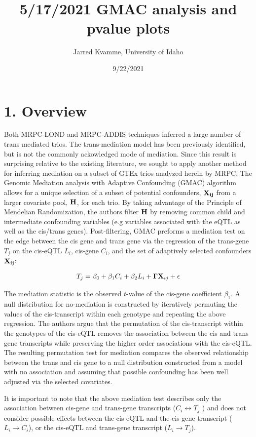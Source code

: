 \documentclass[
]{article}
\title{5/17/2021 GMAC analysis and pvalue plots}
\author{Jarred Kvamme, University of Idaho}
\date{9/22/2021}
\begin{document}
\maketitle

\section*{1. Overview}

Both MRPC-LOND and MRPC-ADDIS techniques inferred a large number of
trans mediated trios. The trans-mediation model has been previously
identified, but is not the commonly ackowledged mode of mediation. Since
this result is surprising relative to the existing literature, we sought
to apply another method for inferring mediation on a subset of GTEx
trios analyzed herein by MRPC. The Genomic Mediation analysis with
Adaptive Confounding (GMAC) algorithm allows for a unique selection of a
subset of potential confounders, \({\bf X_{ij}}\) from a larger
covariate pool, \({\bf H}\), for each trio. By taking advantage of the
Principle of Mendelian Randomization, the authors filter \({\bf H}\) by
removing common child and intermediate confounding variables (e.g
variables associated with the eQTL as well as the cis/trans genes).
Post-filtering, GMAC preforms a mediation test on the edge between the
cis gene and trans gene via the regression of the trans-gene \(T_j\) on
the cis-eQTL \(L_i\), cis-gene \(C_i\), and the set of adaptively
selected confounders \({\bf X_{ij}}\):

\begin{eqnarray} T_j = \beta_0 + \beta_1 C_i + \beta_2 L_i + {\bf \Gamma} {\bf X}_{ij} + \epsilon \end{eqnarray}

The mediation statistic is the observed \(t\)-value of the cis-gene
coefficient \(\beta_1\). A null distribution for no-mediation is
constructed by iteratively permuting the values of the cis-transcript
within each genotype and repeating the above regression. The authors
argue that the permutation of the cis-transcript within the genotypes of
the cis-eQTL removes the association between the cis and trans gene
transcripts while preserving the higher order associations with the
cis-eQTL. The resulting permutation test for mediation compares the
observed relationship between the trans and cis gene to a null
distribution constructed from a model with no association and assuming
that possible confounding has been well adjusted via the selected
covariates.

It is important to note that the above mediation test describes only the
association between cis-gene and trans-gene transcripts
(\(C_i \leftrightarrow T_j\) ) and does not consider possible effects
between the cis-eQTL and the cis-gene transcript
(\(L_i \rightarrow C_i\)), or the cis-eQTL and trans-gene transcript
(\(L_i \rightarrow T_j\)).
\end{document}
